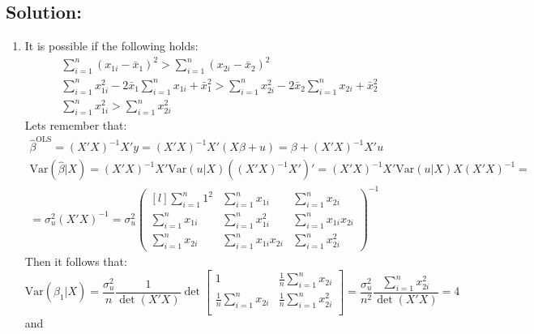 \documentclass[10pt,a4paper]{amsart}
\newcommand{\V}{\text{Var}}
\begin{document}
\subsection*{Solution:}
\begin{enumerate}
      \item
            It is possible if the following holds:
            \begin{gather*}
                  \sum_{i=1}^{n} (x_{1i} - \bar{x}_1)^{2} > \sum_{i=1}^{n}  (x_{2i} - \bar{x}_2)^{2} \\
                  \sum_{i=1}^{n} x_{1i}^{2} - 2\bar{x}_1 \sum_{i=1}^{n} x_{1i} + \bar{x}_1^{2} > \sum_{i=1}^{n} x_{2i}^{2} - 2\bar{x}_2 \sum_{i=1}^{n} x_{2i} + \bar{x}_2^{2} \\
                  \sum_{i=1}^{n} x_{1i}^{2}  > \sum_{i=1}^{n} x_{2i}^{2}
            \end{gather*}
            Lets remember that:
            \begin{gather*}
                  \hat{\beta}^{\text{OLS}} = (X'X)^{-1} X'y = (X'X)^{-1} X'(X\beta + u) = \beta + (X'X)^{-1} X'u \\
                  \V (\hat\beta | X) = (X'X)^{-1} X' \V(u|X)((X'X)^{-1} X')' = (X'X)^{-1} X' \V (u | X) X(X'X)^{-1} =\\
                  = \sigma^{2}_u \left( X'X \right)^{-1} = \sigma^{2}_u\begin{pmatrix*}[l]
                        \sum_{i=1}^{n} 1^{2} & \sum_{i=1}^{n} x_{1i} & \sum_{i=1}^{n} x_{2i} \\
                        \sum_{i=1}^{n} x_{1i} & \sum_{i=1}^{n} x_{1i}^{2} & \sum_{i=1}^{n} x_{1i}x_{2i} \\
                        \sum_{i=1}^{n} x_{2i} & \sum_{i=1}^{n} x_{1i}x_{2i} & \sum_{i=1}^{n} x_{2i}^{2}
                  \end{pmatrix*}^{-1}
            \end{gather*}
            Then it follows that:
            \[
                  \V (\hat\beta_1 | X) = \frac{\sigma^{2}_u}{n} \frac{1}{\det (X'X)} \det \begin{bmatrix*}
                        1 & \frac{1}{n}\sum_{i=1}^{n} x_{2i} \\
                        \frac{1}{n}\sum_{i=1}^{n} x_{2i} & \frac{1}{n}\sum_{i=1}^{n} x_{2i}^{2} \\
                  \end{bmatrix*} = \frac{\sigma^{2}_u}{n^{2}} \frac{\sum_{i=1}^{n} x_{2i}^{2}}{\det(X'X)} = 4
            \]
            and

\end{enumerate}
\end{document}
